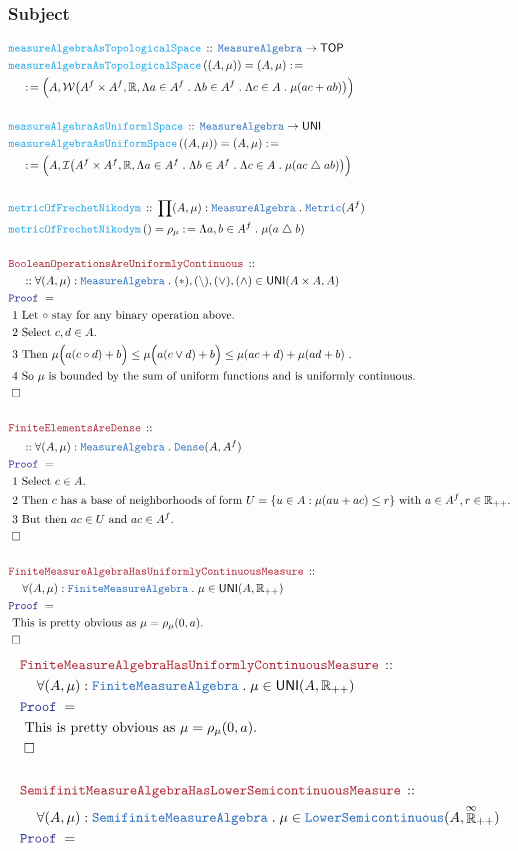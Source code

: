 \documentclass[12pt]{scrartcl}
\newcommand{\TYPE}[1]{\textcolor{NavyBlue}{\mathtt{#1}}}
\newcommand{\FUNC}[1]{\textcolor{Cerulean}{\mathtt{#1}}}
\newcommand{\LOGIC}[1]{\textcolor{Blue}{\mathtt{#1}}}
\newcommand{\THM}[1]{\textcolor{Maroon}{\mathtt{#1}}}
\renewcommand{\.}{\; . \;}
\newcommand{\de}{: \kern 0.1pc =}
\newcommand{\Act}[1]{\left( #1 \right)}
\newcommand{\Theorem}[2]{& \THM{#1} \, :: \, #2 \\ & \Proof = \\ }
\newcommand{\DeclareFunc}[2]{& \FUNC{#1} \, :: \, #2 \\}
\newcommand{\DefineNamedFunc}[4]{&  \FUNC{#1}\Act{#2} = #3 \de #4 \\}
\newcommand{\NewLine}{\\ & \kern 1pc}
\newcommand{\Page}[1]{ \begin{align*} #1 \end{align*}   }
\newcommand{\Reals}{\mathbb{R} }
\newcommand{\EReals}{\stackrel{\mathclap{\infty}}{\mathbb{R}}}
\newcommand{\du}{\; \triangle \;}
\newcommand{\QED}{\; \square}
\newcommand{\EndProof}{& \QED \\}
\newcommand{\Proof}{\LOGIC{Proof} \; }
\newcommand{\Explain}[1]{& \text{#1.} \\}
\newcommand{\Finite}{\TYPE{Finite}}
\newcommand{\Dense}{\TYPE{Dense}}
\newcommand{\TOP}{\mathsf{TOP}}
\newcommand{\UNI}{\mathsf{UNI}}
\newcommand{\Semifinite}{\TYPE{Semifinite}}
\newcommand{\MA}{\TYPE{MeasureAlgebra}}
\begin{document}
\subsubsection{Subject}
\Page{
	\DeclareFunc{measureAlgebraAsTopologicalSpace}
	{
		\MA \to \TOP
	}
	\DefineNamedFunc{measureAlgebraAsTopologicalSpace}{(A,\mu)}{(A,\mu)}
	{
		\NewLine \de 		
		\Big( A, \mathcal{W}\big(A^f \times A^f,
			\Reals, \Lambda a \in A^f \. \Lambda b \in A^f \. \Lambda c \in A \. \mu(ac + ab )\big)\Big) 
	}
	\\
	\DeclareFunc{measureAlgebraAsUniformlSpace}
	{
		\MA \to \UNI
	}
	\DefineNamedFunc{measureAlgebraAsUniformSpace}{(A,\mu)}{(A,\mu)}
	{
		\NewLine \de 		
		\Big( A, \mathcal{I}\big(A^f \times A^f,
			\Reals, \Lambda a \in A^f \. \Lambda b \in A^f \. \Lambda c \in A \. \mu(ac \du ab )\big)\Big) 
	}
	\\
	\DeclareFunc{metricOfFrechetNikodym}
	{
		\prod (A,\mu) : \MA \.  \TYPE{Metric}(A^f) 
	}
	\DefineNamedFunc{metricOfFrechetNikodym}{}{\rho_\mu}
	{
		\Lambda a,b \in A^f \. \mu(a \du b)
	}
	\\
	\Theorem{BooleanOperationsAreUniformlyContinuous}
	{
		\NewLine ::		
		\forall (A,\mu) : \MA \.  (*),(\setminus),(\vee),(\wedge) \in \UNI(A \times A, A)
	}
	\Explain{ 1 Let $\circ$ stay for any binary operation above}
	\Explain{ 2 Select $c,d \in A$}
	\Explain{ 3 Then 
		$
			\mu\Big(a(c \circ d) +  b\Big) \le 
			\mu\Big( a(c \vee d) + b \Big) \le 
			\mu( ac + d) + \mu(ad + b)
		$  }
	\Explain{ 4 So $\mu$ is bounded by the sum of uniform functions and is uniformly continuous}
	\EndProof
	\\
	\Theorem{FiniteElementsAreDense}
	{
		\NewLine ::		
		\forall (A,\mu) : \MA \.  \Dense(A,A^f)
	}
	\Explain{ 1 Select $c \in A$}
	\Explain{ 2 Then $c$ has a base of neighborhoods of form 
		$U = \{ u \in A : \mu(au + ac) \le r\}$ with $a \in A^f, r \in \Reals_{++}$}
	\Explain{ 3 But then $ac \in U$ and $ac \in A^f$}
	\EndProof
	\\
	\Theorem{FiniteMeasureAlgebraHasUniformlyContinuousMeasure}
	{
			\NewLine
			\forall (A,\mu) : \Finite\MA \. \mu \in \UNI(A,\Reals_{++})
	}
	\Explain{ This is pretty obvious as $\mu = \rho_\mu(0,a)$}
	\EndProof
}\Page{
	\Theorem{FiniteMeasureAlgebraHasUniformlyContinuousMeasure}
	{
			\NewLine
			\forall (A,\mu) : \Finite\MA \. \mu \in \UNI(A,\Reals_{++})
	}
	\Explain{ This is pretty obvious as $\mu = \rho_\mu(0,a)$}
	\EndProof
	\\
	\Theorem{SemifinitMeasureAlgebraHasLowerSemicontinuousMeasure}
	{
			\NewLine
			\forall (A,\mu) : \Semifinite\MA \. \mu \in \TYPE{LowerSemicontinuous}(A,\EReals_{++})
}}
\end{document}
